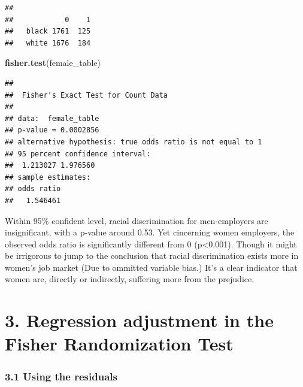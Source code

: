 \documentclass[]{article}
\newenvironment{Shaded}{\begin{snugshade}}{\end{snugshade}}
\newcommand{\KeywordTok}[1]{\textcolor[rgb]{0.13,0.29,0.53}{\textbf{#1}}}
\newcommand{\StringTok}[1]{\textcolor[rgb]{0.31,0.60,0.02}{#1}}
\newcommand{\OperatorTok}[1]{\textcolor[rgb]{0.81,0.36,0.00}{\textbf{#1}}}
\newcommand{\NormalTok}[1]{#1}
\begin{document}
\begin{Shaded}
\end{Shaded}

\begin{verbatim}
##        
##            0    1
##   black 1761  125
##   white 1676  184
\end{verbatim}

\begin{Shaded}
\begin{Highlighting}[]
\KeywordTok{fisher.test}\NormalTok{(female_table)}
\end{Highlighting}
\end{Shaded}

\begin{verbatim}
## 
##  Fisher's Exact Test for Count Data
## 
## data:  female_table
## p-value = 0.0002856
## alternative hypothesis: true odds ratio is not equal to 1
## 95 percent confidence interval:
##  1.213027 1.976560
## sample estimates:
## odds ratio 
##   1.546461
\end{verbatim}

Within 95\% confident level, racial discrimination for men-employers are
insignificant, with a p-value around 0.53. Yet cincerning women
employers, the observed odds ratio is significantly different from 0
(p\textless{}0.001). Though it might be irrigorous to jump to the
conclusion that racial discrimination exists more in women's job market
(Due to ommitted variable bias.) It's a clear indicator that women are,
directly or indirectly, suffering more from the prejudice.

\section*{3. Regression adjustment in the Fisher Randomization Test}\subsubsection*{3.1 Using the residuals}
\end{document}
